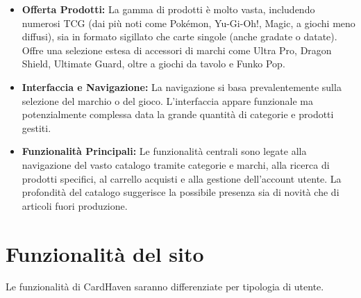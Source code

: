 \documentclass[14pt]{extreport}
\begin{document}
\begin{itemize}
    \item \textbf{Offerta Prodotti:} La gamma di prodotti è molto vasta, includendo numerosi TCG (dai più noti come Pokémon, Yu-Gi-Oh!, Magic, a giochi meno diffusi), sia in formato sigillato che carte singole (anche gradate o datate). Offre una selezione estesa di accessori di marchi come Ultra Pro, Dragon Shield, Ultimate Guard, oltre a giochi da tavolo e Funko Pop.
    \item \textbf{Interfaccia e Navigazione:} La navigazione si basa prevalentemente sulla selezione del marchio o del gioco. L'interfaccia appare funzionale ma potenzialmente complessa data la grande quantità di categorie e prodotti gestiti.
    \item \textbf{Funzionalità Principali:} Le funzionalità centrali sono legate alla navigazione del vasto catalogo tramite categorie e marchi, alla ricerca di prodotti specifici, al carrello acquisti e alla gestione dell'account utente. La profondità del catalogo suggerisce la possibile presenza sia di novità che di articoli fuori produzione.
\end{itemize}


\chapter{Funzionalità del sito}
Le funzionalità di CardHaven saranno differenziate per tipologia di utente.
\end{document}
